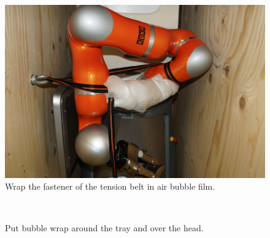 \begin{figure}[h!]
\centering
\includegraphics[width=1\textwidth]{images/packing_21.jpg}
\caption{Wrap the fastener of the tension belt in air bubble film.}
\end{figure}

\begin{figure}[h!]
\centering
\mbox{\quad
{}}
\caption{Put bubble wrap around the tray and over the head.} %
\end{figure}


